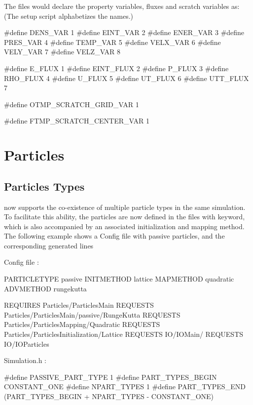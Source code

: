 The  files would declare the property variables, fluxes
and scratch variables as:
(The setup script alphabetizes the names.)

\begin{codeseg}
#define DENS_VAR 1
#define EINT_VAR 2
#define ENER_VAR 3
#define PRES_VAR 4
#define TEMP_VAR 5
#define VELX_VAR 6
#define VELY_VAR 7
#define VELZ_VAR 8

#define E_FLUX 1 
#define EINT_FLUX 2 
#define P_FLUX 3
#define RHO_FLUX 4 
#define U_FLUX 5
#define UT_FLUX 6 
#define UTT_FLUX 7 

#define OTMP_SCRATCH_GRID_VAR 1

#define FTMP_SCRATCH_CENTER_VAR 1

\end{codeseg}


\section{Particles }
\label{Sec:FlashHparticles}
\subsection{Particles Types}
\label{Sec:FlashHparttypes}
\flashx now supports the co-existence of multiple particle types
in the same simulation. To facilitate this ability, the particles are
now defined in the  files with 
keyword, which is also accompanied by an associated initialization and
mapping method. The following example shows a Config file with passive
particles, and the corresponding generated  lines
\begin{codeseg}

Config file :

PARTICLETYPE passive INITMETHOD lattice MAPMETHOD quadratic ADVMETHOD rungekutta

REQUIRES Particles/ParticlesMain
REQUESTS Particles/ParticlesMain/passive/RungeKutta
REQUESTS Particles/ParticlesMapping/Quadratic
REQUESTS Particles/ParticlesInitialization/Lattice
REQUESTS IO/IOMain/
REQUESTS IO/IOParticles

Simulation.h :

#define PASSIVE_PART_TYPE 1
#define PART_TYPES_BEGIN CONSTANT_ONE
#define NPART_TYPES 1
#define PART_TYPES_END (PART_TYPES_BEGIN + NPART_TYPES - CONSTANT_ONE)

\end{codeseg} 

